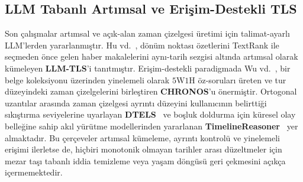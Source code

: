 ﻿\documentclass[journal]{IEEEtran}
\begin{document}
\subsection{LLM Tabanl{\i} Art{\i}msal ve Eri\c{s}im-Destekli TLS}
Son \c{c}al{\i}\c{s}malar art{\i}msal ve a\c{c}{\i}k-alan zaman \c{c}izelgesi \"{u}retimi i\c{c}in talimat-ayarl{\i} LLM'lerden yararlanm{\i}\c{s}t{\i}r. Hu vd.~\cite{hu2024moments}, d\"{o}n\"{u}m noktas{\i} \"{o}zetlerini TextRank ile se\c{c}meden \"{o}nce gelen haber makalelerini ayn{\i}-tarih sezgisi alt{\i}nda art{\i}msal olarak k\"{u}meleyen \textbf{LLM-TLS}'i tan{\i}tm{\i}\c{s}t{\i}r. Eri\c{s}im-destekli paradigmada Wu vd.~\cite{wu2025unfolding}, bir belge koleksiyonu \"{u}zerinden yinelemeli olarak $5\text{W}1\text{H}$ \"{o}z-sorular{\i} \"{u}reten ve tur d\"{u}zeyindeki zaman \c{c}izelgelerini birle\c{s}tiren \textbf{CHRONOS}'u \"{o}nermi\c{s}tir. Ortogonal uzant{\i}lar aras{\i}nda zaman \c{c}izelgesi ayr{\i}nt{\i} d\"{u}zeyini kullan{\i}c{\i}n{\i}n belirtti\u{g}i s{\i}k{\i}\c{s}t{\i}rma seviyelerine uyarlayan \textbf{DTELS}~\cite{dtels2025} ve bo\c{s}luk doldurma i\c{c}in k\"{u}resel olay belle\u{g}ine sahip ak{\i}l y\"{u}r\"{u}tme modellerinden yararlanan \textbf{TimelineReasoner}~\cite{zhang2026timelinereasoner} yer almaktad{\i}r. Bu \c{c}erçeveler art{\i}msal k\"{u}meleme, ayr{\i}nt{\i} kontrol\"{u} ve yinelemeli eri\c{s}imi ilerletse de, hi\c{c}biri monotonik olmayan tarihler aras{\i} d\"{u}zeltmeler i\c{c}in mezar ta\c{s}{\i} tabanl{\i} iddia temizleme veya ya\c{s}am d\"{o}ng\"{u}s\"{u} geri \c{c}ekmesini a\c{c}{\i}k\c{c}a i\c{c}ermemektedir.
\end{document}
